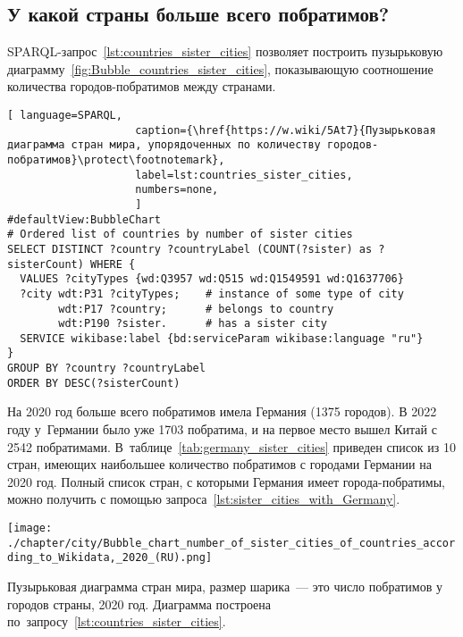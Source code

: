 \subsection{У какой страны больше всего побратимов?}

SPARQL-запрос~\ref{lst:countries_sister_cities} позволяет построить 
пузырьковую диаграмму~\ref{fig:Bubble_countries_sister_cities}, 
показывающую соотношение количества городов-побратимов между странами.

\begin{lstlisting}[ language=SPARQL, 
                    caption={\href{https://w.wiki/5At7}{Пузырьковая диаграмма стран мира, упорядоченных по количеству городов-побратимов}\protect\footnotemark},
                    label=lst:countries_sister_cities,
                    numbers=none,
                    ]
#defaultView:BubbleChart
# Ordered list of countries by number of sister cities
SELECT DISTINCT ?country ?countryLabel (COUNT(?sister) as ?sisterCount) WHERE {
  VALUES ?cityTypes {wd:Q3957 wd:Q515 wd:Q1549591 wd:Q1637706}
  ?city wdt:P31 ?cityTypes;    # instance of some type of city
        wdt:P17 ?country;      # belongs to country
        wdt:P190 ?sister.      # has a sister city
  SERVICE wikibase:label {bd:serviceParam wikibase:language "ru"}
}
GROUP BY ?country ?countryLabel
ORDER BY DESC(?sisterCount)
\end{lstlisting}

На 2020 год больше всего побратимов имела Германия (\num{1375} городов). 
В 2022 году у~Германии было уже 1703 побратима, 
и на первое место вышел Китай с 2542 побратимами. 
В~таблице~\ref{tab:germany_sister_cities} приведен список из 10 стран, 
имеющих наибольшее количество побратимов с городами Германии на 2020 год. 
Полный список стран, с которыми Германия имеет города-побратимы, можно получить с помощью запроса~\ref{lst:sister_cities_with_Germany}.
%
\begin{marginfigure}[-1.5cm]
    \texttt{[image: ./chapter/city/Bubble\_chart\_number\_of\_sister\_cities\_of\_countries\_according\_to\_Wikidata,\_2020\_(RU).png]}
  \caption[Пузырьковая диаграмма стран мира по числу побратимов у городов, 2020 год.]{Пузырьковая диаграмма стран мира, размер шарика~--- это число побратимов у городов страны, 2020 год.
Диаграмма построена по~запросу~\protect\ref{lst:countries_sister_cities}.}%
  \label{fig:Bubble_countries_sister_cities}%
\end{marginfigure}




